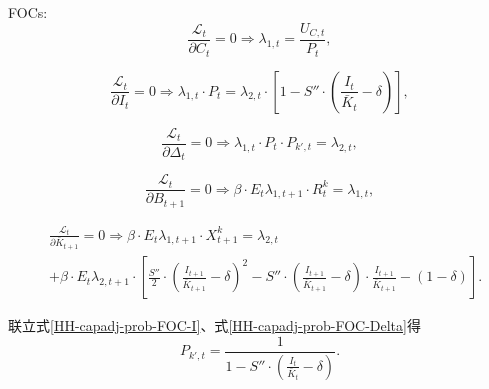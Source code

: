 FOCs:
\begin{equation}
\label{HH-capadj-prob-FOC-C}
\frac{\mathcal{L}_t}{\partial C_t} =0 \Rightarrow \lambda_{1,t} = \frac{U_{C,t}}{P_t},
\end{equation}

\begin{equation}
\label{HH-capadj-prob-FOC-I}
\frac{\mathcal{L}_t}{\partial I_t} =0 \Rightarrow \lambda_{1,t} \cdot P_t = \lambda_{2,t} \cdot \left[1-S''\cdot \left(\frac{I_t}{\bar{K}_t}- \delta \right)\right],
\end{equation}

\begin{equation}
\label{HH-capadj-prob-FOC-Delta}
\frac{\mathcal{L}_t}{\partial \Delta_t} =0 \Rightarrow \lambda_{1,t} \cdot P_t \cdot P_{k',t} = \lambda_{2,t},
\end{equation}

\begin{equation}
\label{HH-capadj-prob-FOC-B}
\frac{\mathcal{L}_t}{\partial B_{t+1}} =0 \Rightarrow \beta \cdot E_t \lambda_{1,t+1} \cdot R^k_t = \lambda_{1,t},
\end{equation}

\begin{align}
\label{HH-capadj-prob-FOC-barK}
&\frac{\mathcal{L}_t}{\partial \bar{K}_{t+1}} =0 \Rightarrow \beta \cdot E_{t} \lambda_{1,t+1} \cdot X^k_{t+1} = \lambda_{2,t} \nonumber \\
&+ \beta \cdot E_t \lambda_{2,t+1} \cdot \left[
\frac{S''}{2} \cdot \left(
\frac{I_{t+1}}{\bar{K}_{t+1}} - \delta
\right)^2
- S'' \cdot \left(\frac{I_{t+1}}{\bar{K}_{t+1}} - \delta\right) \cdot \frac{I_{t+1}}{\bar{K}_{t+1}}
-(1-\delta)
\right].
\end{align}

联立式\eqref{HH-capadj-prob-FOC-I}、式\eqref{HH-capadj-prob-FOC-Delta}得
\begin{equation}
\label{eq:HH-capadj-prob-FOC-pkt-q}
P_{k',t} = \frac{1}{1-S'' \cdot \left(\frac{I_t}{\bar{K}_t} - \delta\right)}.
\end{equation}

